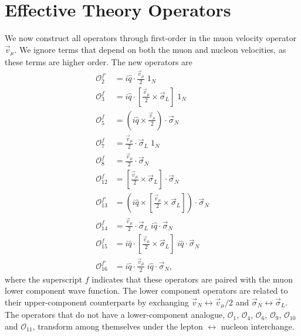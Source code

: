 \documentclass[12pt,letterpaper]{book}
\begin{document}
\section{Effective Theory Operators}
We now construct all operators through first-order in the muon velocity operator $\vec{v}_{\mu}$. We ignore terms that depend on both the muon and nucleon velocities, as these terms are higher order. The new operators are
\begin{equation}
\begin{split}
\mathcal{O}_2^{f'}&=i\hat{q}\cdot\frac{\vec{v}_{\mu}}{2}\;1_N\\
\mathcal{O}_3^f&=i\hat{q}\cdot\left[\frac{\vec{v}_{\mu}}{2}\times\vec{\sigma}_L\right]\;1_N\\
\mathcal{O}_5^f&=\left(i\hat{q}\times\frac{\vec{v}_{\mu}}{2}\right)\cdot\vec{\sigma}_N\\
\mathcal{O}_7^f&=\frac{\vec{v}_{\mu}}{2}\cdot\vec{\sigma}_L\;1_N\\
\mathcal{O}_8^f&=\frac{\vec{v}_{\mu}}{2}\cdot\vec{\sigma}_N\\
\mathcal{O}_{12}^f&=\left[\frac{\vec{v}_{\mu}}{2}\times\vec{\sigma}_L\right]\cdot\vec{\sigma}_N\\
\mathcal{O}_{13}^{f'}&=\left(i\hat{q}\times\left[\frac{\vec{v}_{\mu}}{2}\times\vec{\sigma}_L\right]\right)\cdot\vec{\sigma}_N\\
\mathcal{O}_{14}^f&=\frac{\vec{v}_{\mu}}{2}\cdot\vec{\sigma}_L\;i\hat{q}\cdot\vec{\sigma}_N\\
\mathcal{O}_{15}^f&=i\hat{q}\cdot\left[\frac{\vec{v}_{\mu}}{2}\times\vec{\sigma}_L\right]\;i\hat{q}\cdot\vec{\sigma}_N\\
\mathcal{O}_{16}^{f'}&=i\hat{q}\cdot\frac{\vec{v}_{\mu}}{2}\;i\hat{q}\cdot\vec{\sigma}_N,
\end{split}
\end{equation}
where the superscript $f$ indicates that these operators are paired with the muon lower component wave function. The lower component operators are related to their upper-component counterparts by exchanging $\vec{v}_N\leftrightarrow \vec{v}_{\mu}/2$ and $\vec{\sigma}_N\leftrightarrow\vec{\sigma}_L$. The operators that do not have a lower-component analogue, $\mathcal{O}_1$, $\mathcal{O}_4$, $\mathcal{O}_6$, $\mathcal{O}_9$, $\mathcal{O}_{10}$ and $\mathcal{O}_{11}$, transform among themselves under the lepton $\leftrightarrow$ nucleon interchange.
\end{document}
